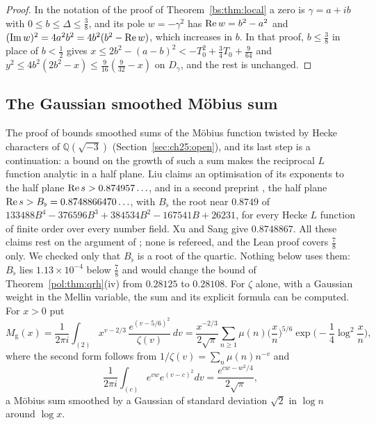 \begin{proof}
In the notation of the proof of Theorem~\ref{bs:thm:local} a zero is $\gamma=a+ib$ with $0\le b\le\Delta\le\frac38$, and its pole $w=-\gamma^2$ has $\operatorname{Re} w=b^2-a^2$ and $(\operatorname{Im} w)^2=4a^2b^2=4b^2(b^2-\operatorname{Re} w)$, which increases in $b$. In that proof, $b\le\frac38$ in place of $b<\frac12$ gives $x\le2b^2-(a-b)^2<-T_0^2+\frac34T_0+\frac9{64}$ and $y^2\le4b^2(2b^2-x)\le\frac9{16}(\frac9{32}-x)$ on $D_\gamma$, and the rest is unchanged.
\end{proof}

\subsection{The Gaussian smoothed M\"obius sum}\label{tx3:sec:signal}

The proof of \cite{OAI26a} bounds smoothed sums of the M\"obius function twisted by Hecke characters of $\mathbb Q(\sqrt{-3})$ (Section~\ref{sec:ch25:open}), and its last step is a continuation: a bound on the growth of such a sum makes the reciprocal $L$ function analytic in a half plane. Liu \cite{Liu26a} claims an optimisation of its exponents to the half plane $\operatorname{Re} s>0.874957\ldots$, and in a second preprint \cite{Liu26b}, the half plane $\operatorname{Re} s>B_\flat=0.8748866470\ldots$, with $B_\flat$ the root near $0.8749$ of $133488B^4-376596B^3+384534B^2-167541B+26231$, for every Hecke $L$ function of finite order over every number field. Xu and Sang \cite{XuSang26} give $0.8748867$. All these claims rest on the argument of \cite{OAI26a}; none is refereed, and the Lean proof covers $\frac78$ only. We checked only that $B_\flat$ is a root of the quartic. Nothing below uses them: $B_\flat$ lies $1.13\times10^{-4}$ below $\frac78$ and would change the bound of Theorem~\ref{pol:thm:qrh}(iv) from $0.28125$ to $0.28108$. For $\zeta$ alone, with a Gaussian weight in the Mellin variable, the sum and its explicit formula can be computed. For $x>0$ put
\begin{equation}\label{tx3:eq:signal}
M_{\mathrm g}(x)=\frac1{2\pi i}\int_{(2)}x^{v-2/3}\,\frac{e^{(v-5/6)^2}}{\zeta(v)}\,dv=\frac{x^{-2/3}}{2\sqrt\pi}\sum_{n\ge1}\mu(n)\Big(\frac xn\Big)^{5/6}\exp\Big(-\frac14\log^2\frac xn\Big),
\end{equation}
where the second form follows from $1/\zeta(v)=\sum_n\mu(n)n^{-v}$ and
\[
\frac1{2\pi i}\int_{(c)}e^{vw}e^{(v-c)^2}dv=\frac{e^{cw-w^2/4}}{2\sqrt\pi},
\]
a M\"obius sum smoothed by a Gaussian of standard deviation $\sqrt2$ in $\log n$ around $\log x$.


